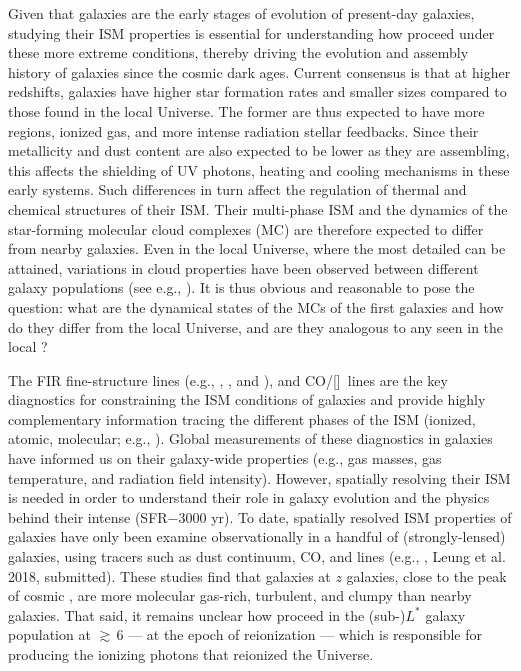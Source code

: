 \documentclass[iop]{emulateapj} %
\begin{document}
Given that \highz galaxies are the early stages of evolution of present-day galaxies, studying their ISM properties is essential for understanding how \SF proceed under these more extreme conditions, thereby driving the evolution and assembly history of galaxies 
since the cosmic dark ages.
Current consensus is that at higher redshifts, galaxies have higher 
star formation rates \citep[SFR; ][]{Behroozi13b, Sparre15a, Maiolino15a, Dunlop17a} and 
smaller sizes \citep[e.g.,][]{Bouwens11a, Ono13a} compared to those found in the local Universe.
The former are thus expected to have more  regions, ionized gas, and more intense radiation stellar feedbacks. 
Since their metallicity and dust content are also expected to be lower as they are assembling, 
this affects the shielding of UV photons, heating and cooling mechanisms in these early systems. Such differences in turn 
affect the regulation of thermal and chemical structures of their ISM. 
Their multi-phase ISM and the dynamics of the star-forming molecular cloud complexes (MC)
are therefore expected to differ from nearby galaxies.
Even in the local Universe, where the most detailed \obs can be attained, variations in cloud properties have been 
observed between different galaxy populations (see e.g., \citealt{Hughes10a, Hughes13b}).
It is thus obvious and reasonable to pose the question: what are the dynamical states of the MCs of the first galaxies and 
how do they differ from the local Universe, and are they analogous to any seen in the local \galpop?
% 

The FIR fine-structure lines (e.g., \cii, \nii, and \oiii), and CO/[\ci]~lines are the key diagnostics for
constraining the ISM conditions of galaxies and
provide highly complementary information tracing the different phases of the ISM (ionized,
atomic, molecular; e.g., \citealt{Scoville74a, Rubin85a, Malhotra01a}).
Global measurements of these diagnostics in \highz galaxies
have informed us on their galaxy-wide properties (e.g.,
gas masses, gas temperature, and radiation field intensity).
However, spatially resolving their ISM is needed in order to understand their role in galaxy evolution and
the physics behind their intense \SF (SFR$-$3000\,\Msun\,yr\pmOne).
To date, spatially resolved ISM properties of \highz galaxies
have only been examine observationally in a handful of (strongly-lensed)
galaxies, using tracers such as
dust continuum, CO, and \cii lines (e.g., \citealt{Swinbank11a, Hodge15a, Ferkinhoff15a, Hodge16a},
Leung et al. 2018, submitted).
These studies find that galaxies at $z$ galaxies, close to the peak of cosmic \SF, are more
molecular gas-rich, turbulent, and clumpy than nearby galaxies.
That said, it remains unclear how \SF proceed in the (sub-)$L^*$ galaxy population at \z$\gtrsim$\,6 --- 
at the epoch of reionization  ---
which is responsible for producing the
ionizing photons that reionized the Universe.
\end{document}
